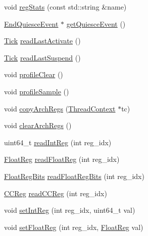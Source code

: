 \begin{DoxyCompactItemize}
\item 
void \hyperlink{classProxyThreadContext_a3dd3443357312bcb75580eaa508c48a4}{regStats} (const std::string \&name)
\item 
\hyperlink{classEndQuiesceEvent}{EndQuiesceEvent} $\ast$ \hyperlink{classProxyThreadContext_a0546f73d19db75274e9d0bc63c5f5908}{getQuiesceEvent} ()
\item 
\hyperlink{base_2types_8hh_a5c8ed81b7d238c9083e1037ba6d61643}{Tick} \hyperlink{classProxyThreadContext_afaa8f9eb8d809cccd31829ba793a433a}{readLastActivate} ()
\item 
\hyperlink{base_2types_8hh_a5c8ed81b7d238c9083e1037ba6d61643}{Tick} \hyperlink{classProxyThreadContext_a7d0b0631c7087d361f6ae11379c06b15}{readLastSuspend} ()
\item 
void \hyperlink{classProxyThreadContext_acf9c88860776d7bd752317e8b550a5d5}{profileClear} ()
\item 
void \hyperlink{classProxyThreadContext_aba547b904bdcf83196f983f79d285caf}{profileSample} ()
\item 
void \hyperlink{classProxyThreadContext_a01b372f805c92c90e6148b76d23d6236}{copyArchRegs} (\hyperlink{classThreadContext}{ThreadContext} $\ast$tc)
\item 
void \hyperlink{classProxyThreadContext_ad5c88ea41846742bd8c70d9c50f31945}{clearArchRegs} ()
\item 
uint64\_\-t \hyperlink{classProxyThreadContext_a21c850cd41ab977a2cf3450fe66ec25a}{readIntReg} (int reg\_\-idx)
\item 
\hyperlink{classThreadContext_a75484259f1855aabc8d74c6eb1cfe186}{FloatReg} \hyperlink{classProxyThreadContext_a2f97d83baef4fbda00b7f7f62779752f}{readFloatReg} (int reg\_\-idx)
\item 
\hyperlink{classThreadContext_aab5eeae86499f9bfe15ef79360eccc64}{FloatRegBits} \hyperlink{classProxyThreadContext_a4998e6615f835676762af364eff198e3}{readFloatRegBits} (int reg\_\-idx)
\item 
\hyperlink{classThreadContext_a0c9de550a32808e6a25b54b6c791d5ab}{CCReg} \hyperlink{classProxyThreadContext_ac3d147c535052bfb1f8e8fe0697168d7}{readCCReg} (int reg\_\-idx)
\item 
void \hyperlink{classProxyThreadContext_abc264e8ee37c6bd7d7b5759b97c34356}{setIntReg} (int reg\_\-idx, uint64\_\-t val)
\item 
void \hyperlink{classProxyThreadContext_ab6fd8e55b81c173f448ec0c42bc28b99}{setFloatReg} (int reg\_\-idx, \hyperlink{classThreadContext_a75484259f1855aabc8d74c6eb1cfe186}{FloatReg} val)

\end{DoxyCompactItemize}
